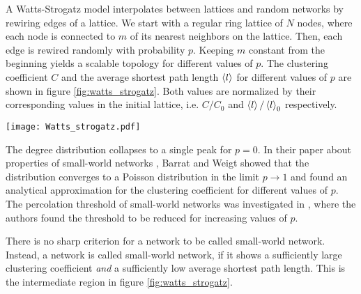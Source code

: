 A Watts-Strogatz model interpolates between lattices and random networks by rewiring edges of a lattice.
We start with a regular ring lattice of $N$ nodes, where each node is connected to $m$ of its nearest neighbors on the lattice.
Then, each edge is rewired randomly with probability $p$.
Keeping $m$ constant from the beginning yields a scalable topology for different values of $p$.
The clustering coefficient $C$ and the average shortest path length $\left< l \right>$ for different values of $p$ are shown in figure \ref{fig:watts_strogatz}.
Both values are normalized by their corresponding values in the initial lattice, i.e. $C/C_0$ and $\left< l \right>/\left< l \right>_0$ respectively.
%
\begin{SCfigure}
\texttt{[image: Watts\_strogatz.pdf]}
\caption{Clustering coefficient and average shortest path length in the Watts-Strogatz model.
Both quantities are  normalized to the the corresponding value for $p=0$.
Results for networks with $N=1000$ nodes and $m=10$.
Every data point is the average of 1000 realizations.}
\label{fig:watts_strogatz}
\end{SCfigure}

The degree distribution collapses to a single peak for $p=0$.
In their paper about properties of small-world networks \citep{Barrat:2000fj}, Barrat and Weigt showed that the distribution converges to a Poisson distribution in the limit $p\rightarrow 1$ and found an analytical approximation for the clustering coefficient for different values of $p$.
The percolation threshold of small-world networks was investigated in \citep{Sander2002293}, where the authors found the threshold to be reduced for increasing values of $p$.

There is no sharp criterion for a network to be called small-world network.
Instead, a network is called small-world network, if it shows a sufficiently large clustering coefficient \emph{and} a sufficiently low average shortest path length.
This is the intermediate region in figure \ref{fig:watts_strogatz}. 

